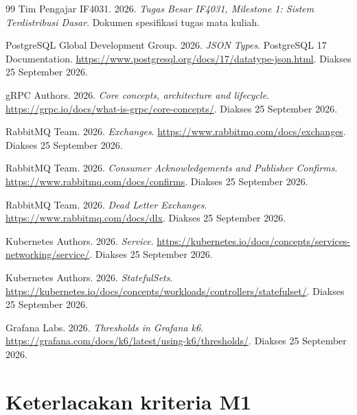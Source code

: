 \documentclass{fairmeta}
\begin{document}
\begin{thebibliography}{99}
Tim Pengajar IF4031. 2026.
\textit{Tugas Besar IF4031, Milestone 1: Sistem Terdistribusi Dasar}.
Dokumen spesifikasi tugas mata kuliah.

PostgreSQL Global Development Group. 2026.
\textit{JSON Types}.
PostgreSQL 17 Documentation.
\url{https://www.postgresql.org/docs/17/datatype-json.html}.
Diakses 25 September 2026.

gRPC Authors. 2026.
\textit{Core concepts, architecture and lifecycle}.
\url{https://grpc.io/docs/what-is-grpc/core-concepts/}.
Diakses 25 September 2026.

RabbitMQ Team. 2026.
\textit{Exchanges}.
\url{https://www.rabbitmq.com/docs/exchanges}.
Diakses 25 September 2026.

RabbitMQ Team. 2026.
\textit{Consumer Acknowledgements and Publisher Confirms}.
\url{https://www.rabbitmq.com/docs/confirms}.
Diakses 25 September 2026.

RabbitMQ Team. 2026.
\textit{Dead Letter Exchanges}.
\url{https://www.rabbitmq.com/docs/dlx}.
Diakses 25 September 2026.

Kubernetes Authors. 2026.
\textit{Service}.
\url{https://kubernetes.io/docs/concepts/services-networking/service/}.
Diakses 25 September 2026.

Kubernetes Authors. 2026.
\textit{StatefulSets}.
\url{https://kubernetes.io/docs/concepts/workloads/controllers/statefulset/}.
Diakses 25 September 2026.

Grafana Labs. 2026.
\textit{Thresholds in Grafana k6}.
\url{https://grafana.com/docs/k6/latest/using-k6/thresholds/}.
Diakses 25 September 2026.
\end{thebibliography}

\appendix
\section{Keterlacakan kriteria M1}
\label{sec:traceability}
\end{document}
